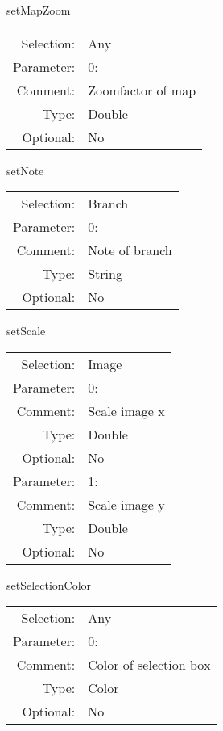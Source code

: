 \item setMapZoom\\
\begin{tabular}{rl}
  Selection: & Any\\
   Parameter: &  0:\\
        Comment: & Zoomfactor of map\\
           Type: & Double\\
       Optional: &  No\\
\end{tabular}

\item setNote\\
\begin{tabular}{rl}
  Selection: & Branch\\
   Parameter: &  0:\\
        Comment: & Note of branch\\
           Type: & String\\
       Optional: &  No\\
\end{tabular}

\item setScale\\
\begin{tabular}{rl}
  Selection: & Image\\
   Parameter: &  0:\\
        Comment: & Scale image x\\
           Type: & Double\\
       Optional: &  No\\
   Parameter: &  1:\\
        Comment: & Scale image y\\
           Type: & Double\\
       Optional: &  No\\
\end{tabular}

\item setSelectionColor\\
\begin{tabular}{rl}
  Selection: & Any\\
   Parameter: &  0:\\
        Comment: & Color of selection box\\
           Type: & Color\\
       Optional: &  No\\
\end{tabular}

